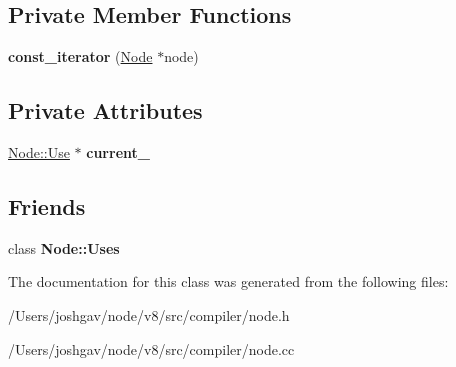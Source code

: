 \subsection*{Private Member Functions}
\begin{DoxyCompactItemize}
\item 
{\bfseries const\+\_\+iterator} (\hyperlink{classv8_1_1internal_1_1compiler_1_1_node}{Node} $\ast$node)\hypertarget{classv8_1_1internal_1_1compiler_1_1_node_1_1_uses_1_1const__iterator_adc38974d5524abf388a21706816d93da}{}\label{classv8_1_1internal_1_1compiler_1_1_node_1_1_uses_1_1const__iterator_adc38974d5524abf388a21706816d93da}

\end{DoxyCompactItemize}
\subsection*{Private Attributes}
\begin{DoxyCompactItemize}
\item 
\hyperlink{structv8_1_1internal_1_1compiler_1_1_node_1_1_use}{Node\+::\+Use} $\ast$ {\bfseries current\+\_\+}\hypertarget{classv8_1_1internal_1_1compiler_1_1_node_1_1_uses_1_1const__iterator_ace55f237ce1aa96baf46e69e3197b817}{}\label{classv8_1_1internal_1_1compiler_1_1_node_1_1_uses_1_1const__iterator_ace55f237ce1aa96baf46e69e3197b817}

\end{DoxyCompactItemize}
\subsection*{Friends}
\begin{DoxyCompactItemize}
\item 
class {\bfseries Node\+::\+Uses}\hypertarget{classv8_1_1internal_1_1compiler_1_1_node_1_1_uses_1_1const__iterator_a60c44f047a4840772c2e4c83c8c06cad}{}\label{classv8_1_1internal_1_1compiler_1_1_node_1_1_uses_1_1const__iterator_a60c44f047a4840772c2e4c83c8c06cad}

\end{DoxyCompactItemize}


The documentation for this class was generated from the following files\+:\begin{DoxyCompactItemize}
\item 
/\+Users/joshgav/node/v8/src/compiler/node.\+h\item 
/\+Users/joshgav/node/v8/src/compiler/node.\+cc\end{DoxyCompactItemize}
